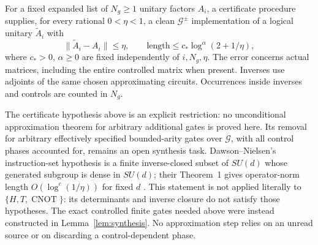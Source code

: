\begin{definition}\label{def:certificates}
For a fixed expanded list of $N_g\ge1$ unitary factors $A_i$, a certificate procedure supplies, for every rational $0<\eta<1$, a clean $\mathcal G^{\pm}$ implementation of a logical unitary $\widetilde A_i$ with
\[
\|\widetilde A_i-A_i\|\le\eta,\qquad
\text{length}\le c_*\log^\alpha(2+1/\eta),
\]
where $c_*>0$, $\alpha\ge0$ are fixed independently of $i,N_g,\eta$.
The error concerns actual matrices, including the entire controlled matrix when present. Inverses use adjoints of the same chosen approximating circuits. Occurrences inside inverses and controls are counted in $N_g$.
\end{definition}

\begin{remark}\label{rem:sk}
The certificate hypothesis above is an explicit restriction: no
unconditional approximation theorem for arbitrary additional gates is
proved here. Its removal for arbitrary effectively specified bounded-arity
gates over $\mathcal G$, with all control phases accounted for, remains
an open synthesis task.
Dawson--Nielsen's instruction-set hypothesis is a finite inverse-closed
subset of $SU(d)$ whose generated subgroup is dense in $SU(d)$; their Theorem~1 gives
operator-norm length $O(\log^c(1/\eta))$ for fixed $d$
\cite[Definition~1, PDF p.~2; Theorem~1, PDF p.~4]{DawsonNielsen2006}.
This statement is not applied literally to $\{H,T,\operatorname{CNOT}\}$:
its determinants and inverse closure do not satisfy those hypotheses.
The exact controlled finite gates needed above were instead constructed
in Lemma~\ref{lem:synthesis}. No approximation step relies on an
unread source or on discarding a control-dependent phase.
\end{remark}

